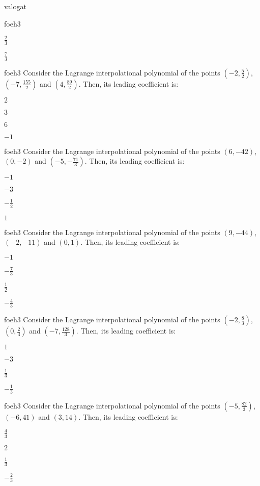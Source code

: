\documentclass[12pt]{article}
\begin{document}
\begin{quiz}{valogat}
\begin{multi}{foeh3}
\item  $ \frac{2}{3} $
\item  $ \frac{7}{3} $
\end{multi}
\begin{multi}{foeh3}
Consider the Lagrange interpolational polynomial of the points $(-2,\frac{5}{2})$, $(-7,\frac{155}{2})$ and $(4,\frac{89}{2})$.
Then, its leading coefficient is:
\item* $ 2 $
\item  $ 3 $
\item  $ 6 $
\item  $ -1 $
\end{multi}
\begin{multi}{foeh3}
Consider the Lagrange interpolational polynomial of the points $(6,-42)$, $(0,-2)$ and $(-5,-\frac{71}{3})$.
Then, its leading coefficient is:
\item* $ -1 $
\item  $ -3 $
\item  $ -\frac{1}{2} $
\item  $ 1 $
\end{multi}
\begin{multi}{foeh3}
Consider the Lagrange interpolational polynomial of the points $(9,-44)$, $(-2,-11)$ and $(0,1)$.
Then, its leading coefficient is:
\item* $ -1 $
\item  $ -\frac{7}{3} $
\item  $ \frac{1}{2} $
\item  $ -\frac{4}{3} $
\end{multi}
\begin{multi}{foeh3}
Consider the Lagrange interpolational polynomial of the points $(-2,\frac{8}{3})$, $(0,\frac{2}{3})$ and $(-7,\frac{128}{3})$.
Then, its leading coefficient is:
\item* $ 1 $
\item  $ -3 $
\item  $ \frac{1}{3} $
\item  $ -\frac{1}{3} $
\end{multi}
\begin{multi}{foeh3}
Consider the Lagrange interpolational polynomial of the points $(-5,\frac{82}{3})$, $(-6,41)$ and $(3,14)$.
Then, its leading coefficient is:
\item* $ \frac{4}{3} $
\item  $ 2 $
\item  $ \frac{1}{3} $
\item  $ -\frac{2}{3} $
\end{multi}

\end{quiz}
\end{document}
